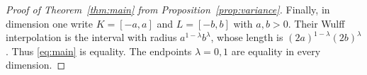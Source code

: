 \begin{proof}[Proof of Theorem~\ref{thm:main} from Proposition~\ref{prop:variance}]
Finally, in dimension one write $K=[-a,a]$ and $L=[-b,b]$ with
$a,b>0$. Their Wulff interpolation is the interval with radius
$a^{1-\lambda}b^\lambda$, whose length is
$(2a)^{1-\lambda}(2b)^\lambda$. Thus \eqref{eq:main} is equality.
The endpoints $\lambda=0,1$ are equality in every dimension.
\end{proof}
